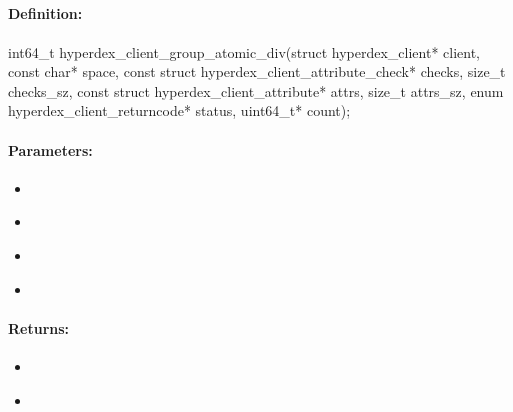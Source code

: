 \pagebreak
\subsection{}
\label{api:c:group_atomic_div}


\paragraph{Definition:}
\begin{ccode}
int64_t hyperdex_client_group_atomic_div(struct hyperdex_client* client,
        const char* space,
        const struct hyperdex_client_attribute_check* checks, size_t checks_sz,
        const struct hyperdex_client_attribute* attrs, size_t attrs_sz,
        enum hyperdex_client_returncode* status,
        uint64_t* count);
\end{ccode}

\paragraph{Parameters:}
\begin{itemize}[noitemsep]
\item {}\\

\item {}\\

\item {}\\

\item {}\\

\end{itemize}

\paragraph{Returns:}
\begin{itemize}[noitemsep]
\item {}\\

\item {}\\

\end{itemize}

